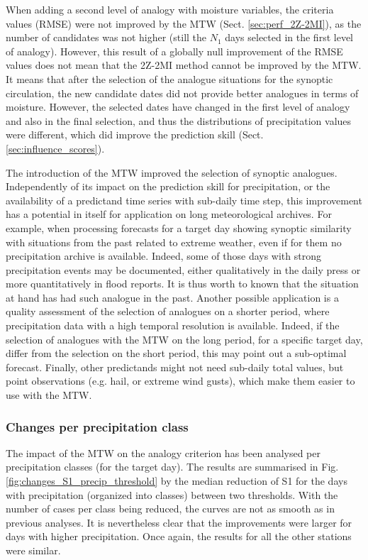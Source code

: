\documentclass[hess, manuscript]{copernicus}
\begin{document}
	When adding a second level of analogy with moisture variables, the criteria values (RMSE) were not improved by the MTW (Sect. \ref{sec:perf_2Z-2MI}), as the number of candidates was not higher (still the $N_{1}$ days selected in the first level of analogy). However, this result of a globally null improvement of the RMSE values does not mean that the 2Z-2MI method cannot be improved by the MTW. It means that after the selection of the analogue situations for the synoptic circulation, the new candidate dates did not provide better analogues in terms of moisture. However, the selected dates have changed in the first level of analogy and also in the final selection, and thus the distributions of precipitation values were different, which did improve the prediction skill (Sect. \ref{sec:influence_scores}).
	
	The introduction of the MTW improved the selection of synoptic analogues. Independently of its impact on the prediction skill for precipitation, or the availability of a predictand time series with sub-daily time step, this improvement has a potential in itself for application on long meteorological archives. For example, when processing forecasts for a target day showing synoptic similarity with situations from the past related to extreme weather, even if for them no precipitation archive is available. Indeed, some of those days with strong precipitation events may be documented, either qualitatively in the daily press or more quantitatively in flood reports. It is thus worth to known that the situation at hand has had such analogue in the past. Another possible application is a quality assessment of the selection of analogues on a shorter period, where precipitation data with a high temporal resolution is available. Indeed, if the selection of analogues with the MTW on the long period, for a specific target day, differ from the selection on the short period, this may point out a sub-optimal forecast. Finally, other predictands might not need sub-daily total values, but point observations (e.g. hail, or extreme wind gusts), which make them easier to use with the MTW.
	
	
	\subsubsection{Changes per precipitation class}
	\label{sec:influence_precip}
	
	The impact of the MTW on the analogy criterion has been analysed per precipitation classes (for the target day). The results are summarised in Fig. \ref{fig:changes_S1_precip_threshold} by the median reduction of S1 for the days with precipitation (organized into classes) between two thresholds. With the number of cases per class being reduced, the curves are not as smooth as in previous analyses. It is nevertheless clear that the improvements were larger for days with higher precipitation. Once again, the results for all the other stations were similar.
	
\end{document}
